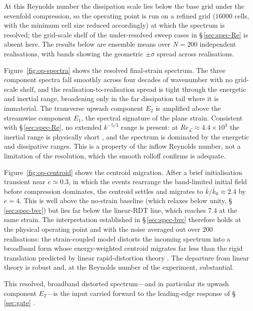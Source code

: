\documentclass[lineno]{JFM-FLM_Au}
\begin{document}
At this Reynolds number the dissipation scale lies below the base grid under
the sevenfold compression, so the operating point is run on a refined grid
($16000$ cells, with the minimum cell size reduced accordingly) at which the
spectrum is resolved; the grid-scale shelf of the under-resolved sweep cases in
\S\,\ref{sec:spec-Re} is absent here. The results below are ensemble means over
$N=200$ independent realisations, with bands showing the geometric $\pm\sigma$
spread across realisations.

Figure~\ref{fig:op-spectra} shows the resolved final-strain spectrum. The three
component spectra fall smoothly across four decades of wavenumber with no
grid-scale shelf, and the realisation-to-realisation spread is tight through the
energetic and inertial range, broadening only in the far dissipation tail where
it is immaterial. The transverse upwash component $E_2$ is amplified above the
streamwise component $E_1$, the spectral signature of the plane strain.
Consistent with \S\,\ref{sec:spec-Re}, no extended $k^{-5/3}$ range is present:
at $Re_{\mathcal{L}}\approx4.4\times10^3$ the inertial range is physically short
\citep{Pope2000}, and the spectrum is dominated by the energetic and dissipative
ranges. This is a property of the inflow Reynolds number, not a limitation of
the resolution, which the smooth rolloff confirms is adequate.

Figure~\ref{fig:op-centroid} shows the centroid migration. After a brief
initialisation transient near $e\simeq0.3$, in which the events rearrange the
band-limited initial field before compression dominates, the centroid settles
and migrates to $\bar k/\bar k_0\approx2.4$ by $e=4$. This is well above the
no-strain baseline (which relaxes below unity, \S\,\ref{sec:spec-bvc}) but lies
far below the linear-RDT line, which reaches $7.4$ at the same strain. The
interpretation established in \S\,\ref{sec:spec-bvc} therefore holds at the
physical operating point and with the noise averaged out over $200$
realisations: the strain-coupled model distorts the incoming spectrum into a
broadband form whose energy-weighted centroid migrates far less than the rigid
translation predicted by linear rapid-distortion theory
\citep{BatchelorProudman1954,HuntCarruthers1990}. The departure from linear
theory is robust and, at the Reynolds number of the experiment, substantial.

This resolved, broadband distorted spectrum---and in particular its upwash
component $E_2$---is the input carried forward to the leading-edge response of
\S\,\ref{sec:gate} \citep{Amiet1975}.
\end{document}
